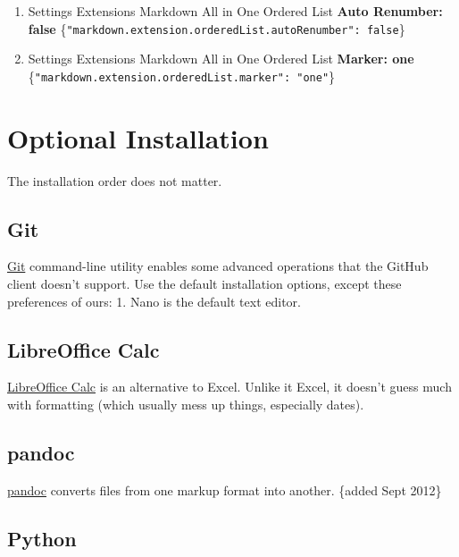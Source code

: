 \documentclass[
]{book}
\providecommand{\tightlist}{%
  \setlength{\itemsep}{0pt}\setlength{\parskip}{0pt}}
\begin{document}
\begin{enumerate}
\def\labelenumi{\arabic{enumi}.}
\tightlist
\item
  Settings \textbar{} Extensions \textbar Markdown All in One \textbar{} Ordered List \textbar{} \textbf{Auto Renumber: false} \{\texttt{"markdown.extension.orderedList.autoRenumber":\ false}\}
\item
  Settings \textbar{} Extensions \textbar Markdown All in One \textbar{} Ordered List \textbar{} \textbf{Marker: one} \{\texttt{"markdown.extension.orderedList.marker":\ "one"}\}
\end{enumerate}

\hypertarget{workstation-optional}{%
\section{Optional Installation}\label{workstation-optional}}

The installation order does not matter.

\hypertarget{workstation-git}{%
\subsection{Git}\label{workstation-git}}

\href{https://git-scm.com/downloads}{Git} command-line utility enables some advanced operations that the GitHub client doesn't support. Use the default installation options, except these preferences of ours:
1. Nano is the default text editor.

\hypertarget{workstation-calc}{%
\subsection{LibreOffice Calc}\label{workstation-calc}}

\href{https://www.libreoffice.org/discover/calc/}{LibreOffice Calc} is an alternative to Excel. Unlike it Excel, it doesn't guess much with formatting (which usually mess up things, especially dates).

\hypertarget{workstation-pandoc}{%
\subsection{pandoc}\label{workstation-pandoc}}

\href{https://pandoc.org/}{pandoc} converts files from one markup format into another. \{added Sept 2012\}

\hypertarget{workstation-python}{%
\subsection{Python}\label{workstation-python}}
\end{document}
